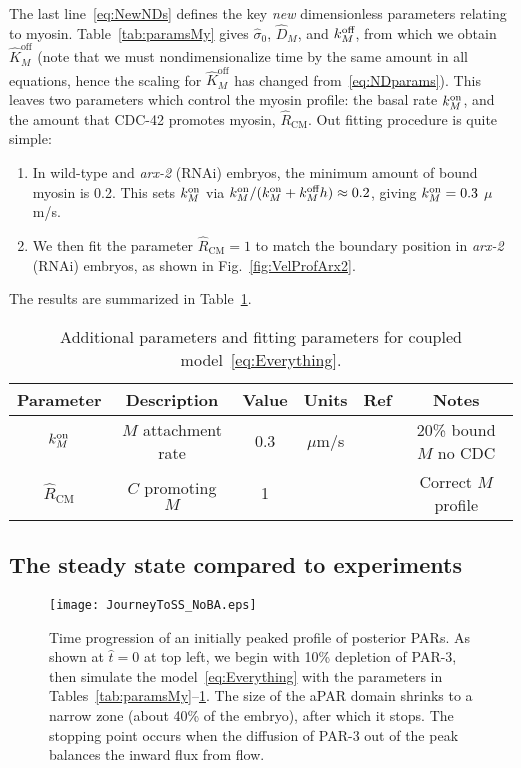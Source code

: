 \documentclass[11pt]{article}
\newcommand{\6}[1]{#1_{\text{6}}}
\newcommand{\3}[1]{#1_{\text{3}}}
\begin{document}
The last line\ \eqref{eq:NewNDs} defines the key \emph{new} dimensionless parameters relating to myosin. Table\ \ref{tab:paramsMy} gives $\hat{\sigma}_0$, $\hat D_M$, and $k^\text{off}_M$, from which we obtain $\hat K^\text{off}_M$ (note that we must nondimensionalize time by the same amount in all equations, hence the scaling for $\hat K^\text{off}_M$ has changed from\ \eqref{eq:NDparams}). This leaves two parameters which control the myosin profile: the basal rate $k^\text{on}_M$, and the amount that CDC-42 promotes myosin, $\hat R_\text{CM}$. Out fitting procedure is quite simple:
\begin{enumerate}
\item In wild-type and \emph{arx-2} (RNAi) embryos, the minimum amount of bound myosin is 0.2. This sets $k^\text{on}_M$ via $k^\text{on}_M/(k^\text{on}_M+k^\text{off}_M h) \approx 0.2$, giving $k^\text{on}_M=0.3$ $\mu$m/s.
\item We then fit the parameter $\hat R_\text{CM}=1$ to match the boundary position in \emph{arx-2} (RNAi) embryos, as shown in Fig.\ \ref{fig:VelProfArx2}.
\end{enumerate}
The results are summarized in Table\ \ref{tab:paramsC}.

\begin{table}
\begin{small}
\centering
\begin{tabular}{|c|c|c|c|c|c|}\hline
Parameter & Description & Value & Units & Ref & Notes \\ \hline
$k^\text{on}_M$ & $M$ attachment rate & 0.3 & $\mu$m/s & & 20\% bound $M$ no CDC \\
$\hat R_\text{CM}$ & $C$ promoting $M$ & 1 & &  & Correct $M$ profile\\ \hline
\end{tabular}
\caption{\label{tab:paramsC} Additional parameters and fitting parameters for coupled model\ \eqref{eq:Everything}.}
\end{small}
\end{table}


\subsection{The steady state compared to experiments}

\begin{figure}
\centering
\texttt{[image: JourneyToSS\_NoBA.eps]}
\caption{\label{fig:TimeSeqNoBA} Time progression of an initially peaked profile of posterior PARs. As shown at $\hat t=0$ at top left, we begin with 10\% depletion of PAR-3, then simulate the model\ \eqref{eq:Everything} with the parameters in Tables\ \ref{tab:paramsMy}--\ref{tab:paramsC}. The size of the aPAR domain shrinks to a narrow zone (about 40\% of the embryo), after which it stops. The stopping point occurs when the diffusion of PAR-3 out of the peak balances the inward flux from flow.}
\end{figure}
\end{document}
